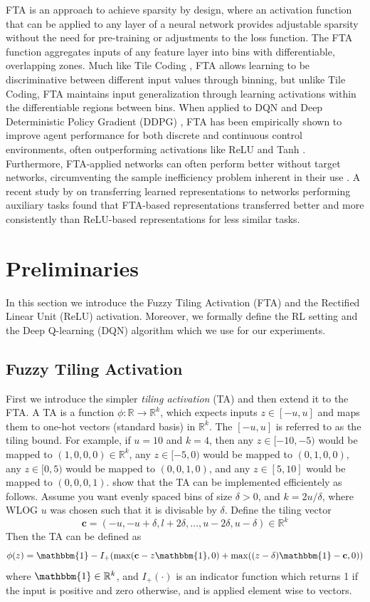 \documentclass{article}
\newcommand{\RR}{\mathbb{R}}
\begin{document}
FTA is an approach to achieve sparsity by design,
where an activation function that can be applied to any layer of a neural network provides adjustable sparsity without the need for pre-training or adjustments to the loss function.
The FTA function aggregates inputs of any feature layer into bins with differentiable, overlapping zones. Much like Tile Coding \cite[]{tilecoding},
FTA allows learning to be discriminative between different input values through binning, but unlike Tile Coding,
FTA maintains input generalization through learning activations within the differentiable regions between bins.
When applied to DQN and Deep Deterministic Policy Gradient (DDPG) \cite[]{ddpg},
FTA has been empirically shown to improve agent performance for both discrete and continuous control environments,
often outperforming activations like ReLU and Tanh \cite[]{pan2019fuzzy}. Furthermore, FTA-applied networks can often perform better without target networks,
circumventing the sample inefficiency problem inherent in their use \cite[]{pan2019fuzzy}.
A recent study by \cite{nnrep} on transferring learned representations to networks performing auxiliary tasks found that FTA-based representations
transferred better and more consistently than ReLU-based representations for less similar tasks.

\section{Preliminaries} \label{sec:prelims}
In this section we introduce the Fuzzy Tiling Activation (FTA) and the Rectified Linear Unit (ReLU) activation.
Moreover, we formally define the RL setting and the Deep Q-learning (DQN) algorithm which we use for our experiments.

\subsection{Fuzzy Tiling Activation}
First we introduce the simpler \textit{tiling activation} (TA) and then extend it to the FTA.
A TA is a function $\phi: \RR \to \RR^k$, which expects inputs $z \in [-u, u]$ and maps them to one-hot vectors (standard basis) in $\RR^k$.
The $[-u, u]$ is referred to as the tiling bound.
For example, if $u=10$ and $k=4$, then any $z \in [-10,-5)$ would be mapped to $(1, 0 ,0, 0) \in \RR^k$, any $z \in [-5, 0)$ would be mapped to $(0, 1, 0, 0)$, any $z \in [0, 5)$ would be mapped to $(0, 0, 1, 0)$, and any $z \in [5, 10]$ would be mapped to $(0, 0, 0, 1)$.
\cite{pan2019fuzzy} show that the TA can be implemented efficientely as follows.
Assume you want evenly spaced bins of size $\delta > 0$, and $k = 2 u/ \delta$, where WLOG $u$ was chosen such that it is divisable by $\delta$.
Define the tiling vector
$$\mathbf{c} = (-u, -u + \delta, l + 2 \delta, \dots, u - 2 \delta, u - \delta) \in \RR^k$$
Then the TA can be defined as
$$\phi(z) = \mathbbm{1} - I_+(\max(\mathbf{c} - z\mathbbm{1}, 0) + \max((z -\delta)\mathbbm{1} - \mathbf{c}, 0))$$
where $\mathbbm{1} \in \RR^k$, and $I_+(\cdot)$ is an indicator function which returns 1 if the input is positive and zero otherwise, and is applied element wise to vectors.
\end{document}
